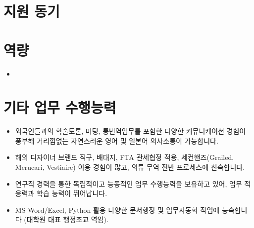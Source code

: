 \section*{지원 동기}
\lipsum

\section*{역량}
\begin{itemize}
\item 
\end{itemize}

\section*{기타 업무 수행능력}
\begin{itemize}
    \item 외국인들과의 학술토론, 미팅, 통번역업무를 포함한 다양한 커뮤니케이션 경험이 풍부해 거리낌없는 자연스러운 영어 및 일본어 의사소통이 가능합니다.
    \item 해외 디자이너 브랜드 직구, 배대지, FTA 관세협정 적용, 세컨핸즈(Grailed, Merucari, Vestiaire) 이용 경험이 많고, 의류 무역 전반 프로세스에 친숙합니다.
    
    \item 연구직 경력을 통한 독립적이고 능동적인 업무 수행능력을 보유하고 있어, 업무 적응력과 학습 능력이 뛰어납니다.
    \item MS Word/Excel, Python 활용 다양한 문서행정 및 업무자동화 작업에 능숙합니다 (대학원 대표 행정조교 역임).
\end{itemize}
